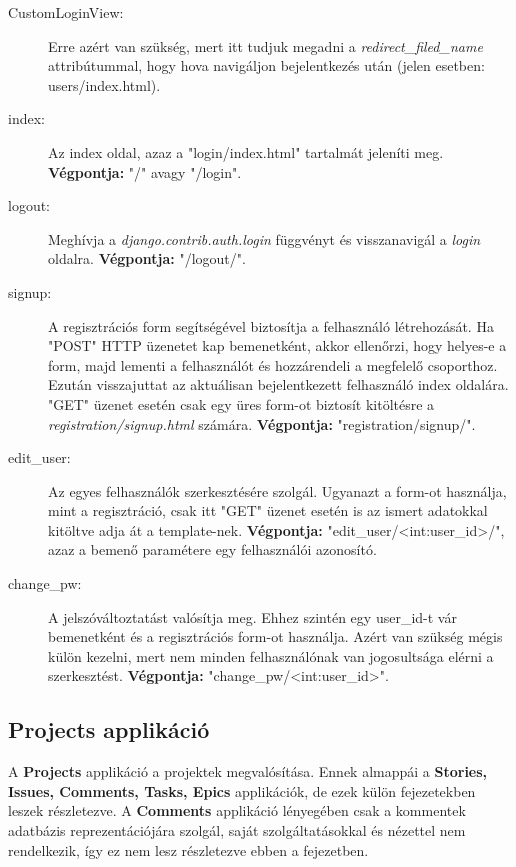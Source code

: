 \begin{itemize}
	\begin{description}
		\item[CustomLoginView:] Erre azért van szükség, mert itt tudjuk megadni a \textit{redirect\_filed\_name} attribútummal, hogy hova navigáljon bejelentkezés után (jelen esetben: users/index.html).
		\item[index:] Az index oldal, azaz a "login/index.html" tartalmát jeleníti meg. 
\textbf{Végpontja:} "/" avagy "/login".
		\item[logout:] Meghívja a  \textit{django.contrib.auth.login} függvényt és visszanavigál a \textit{login} oldalra. 
\textbf{Végpontja:} "/logout/".
		\item[signup:] A regisztrációs form segítségével biztosítja a felhasználó létrehozását. Ha "POST" HTTP üzenetet kap bemenetként, akkor ellenőrzi, hogy helyes-e a form, majd lementi a felhasználót és hozzárendeli a megfelelő csoporthoz. Ezután visszajuttat az aktuálisan bejelentkezett felhasználó index oldalára. "GET" üzenet esetén csak egy üres form-ot biztosít kitöltésre a \textit{registration/signup.html} számára. 
\textbf{Végpontja:} "registration/signup/".
		\item[edit\_user:] Az egyes felhasználók szerkesztésére szolgál. Ugyanazt a form-ot használja, mint a regisztráció, csak itt "GET" üzenet esetén is az ismert adatokkal kitöltve adja át a template-nek. 
\textbf{Végpontja:} "edit\_user/<int:user\_id>/", azaz a bemenő paramétere egy felhasználói azonosító.
		\item[change\_pw:] A jelszóváltoztatást valósítja meg. Ehhez szintén egy user\_id-t vár bemenetként és a regisztrációs form-ot használja. Azért van szükség mégis külön kezelni, mert nem minden felhasználónak van jogosultsága elérni a szerkesztést. 
\textbf{Végpontja:} "change\_pw/<int:user\_id>".
	\end{description}
\end{itemize}

\subsection{Projects applikáció}

A \textbf{Projects} applikáció a projektek megvalósítása. Ennek almappái a \textbf{Stories, Issues, Comments, Tasks, Epics} applikációk, de ezek külön fejezetekben leszek részletezve. A \textbf{Comments} applikáció lényegében csak a kommentek adatbázis reprezentációjára szolgál, saját szolgáltatásokkal és nézettel nem rendelkezik, így ez nem lesz részletezve ebben a fejezetben.

